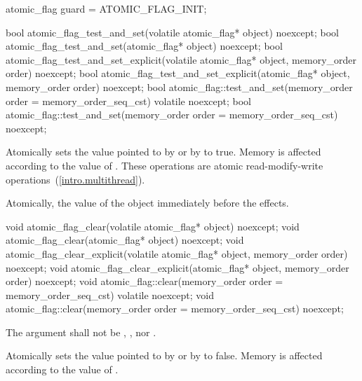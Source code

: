 \begin{codeblock}
atomic_flag guard = ATOMIC_FLAG_INIT;
\end{codeblock}
\exitexample

%
%
\begin{itemdecl}
bool atomic_flag_test_and_set(volatile atomic_flag* object) noexcept;
bool atomic_flag_test_and_set(atomic_flag* object) noexcept;
bool atomic_flag_test_and_set_explicit(volatile atomic_flag* object, memory_order order) noexcept;
bool atomic_flag_test_and_set_explicit(atomic_flag* object, memory_order order) noexcept;
bool atomic_flag::test_and_set(memory_order order = memory_order_seq_cst) volatile noexcept;
bool atomic_flag::test_and_set(memory_order order = memory_order_seq_cst) noexcept;
\end{itemdecl}

\begin{itemdescr}
\pnum
\effects Atomically sets the value pointed to by  or by  to true. Memory is affected according to the value of
. These operations are atomic read-modify-write operations~(\ref{intro.multithread}).

\pnum
\returns Atomically, the value of the object immediately before the effects. \end{itemdescr}

%
%
%
%
\begin{itemdecl}
void atomic_flag_clear(volatile atomic_flag* object) noexcept;
void atomic_flag_clear(atomic_flag* object) noexcept;
void atomic_flag_clear_explicit(volatile atomic_flag* object, memory_order order) noexcept;
void atomic_flag_clear_explicit(atomic_flag* object, memory_order order) noexcept;
void atomic_flag::clear(memory_order order = memory_order_seq_cst) volatile noexcept;
void atomic_flag::clear(memory_order order = memory_order_seq_cst) noexcept;
\end{itemdecl}

\begin{itemdescr}
\pnum
\requires The  argument shall not be ,
, nor .

\pnum
\effects Atomically sets the value pointed to by  or by  to
false. Memory is affected according to the value of .
\end{itemdescr}

